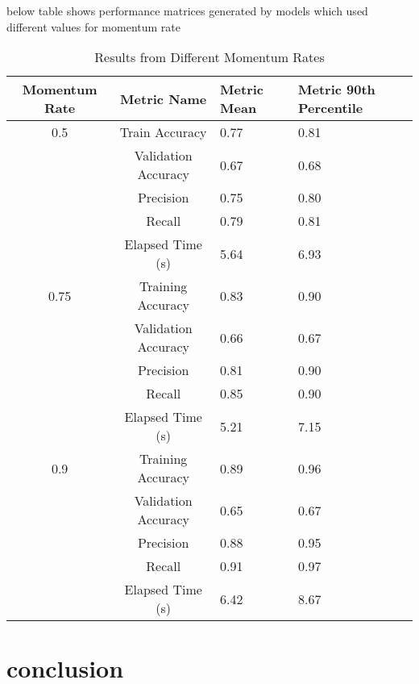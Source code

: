 \documentclass{article}
\begin{document}
below table shows performance matrices generated by models which used different values for momentum rate 
\begin{table}[h]
\begin{center}
\begin{tabular}{ |c|c|p{1.5cm}|p{2cm}|} 
\hline
Momentum Rate & Metric Name & Metric Mean & Metric 90th Percentile\\
\hline
0.5 & Train Accuracy & 0.77 & 0.81\\ 
& Validation Accuracy & 0.67 & 0.68\\ 
& Precision & 0.75 & 0.80 \\ 
& Recall & 0.79 & 0.81 \\ 
& Elapsed Time (s) & 5.64 & 6.93 \\
\hline
0.75 & Training Accuracy & 0.83 & 0.90\\ 
& Validation Accuracy & 0.66 & 0.67 \\ 
& Precision & 0.81 & 0.90 \\ 
& Recall & 0.85 & 0.90 \\ 
& Elapsed Time (s) & 5.21 & 7.15 \\
\hline
0.9 & Training Accuracy & 0.89 & 0.96\\ 
& Validation Accuracy & 0.65 & 0.67 \\ 
& Precision & 0.88 & 0.95 \\ 
& Recall & 0.91 & 0.97 \\ 
& Elapsed Time (s) & 6.42 & 8.67 \\
\hline
\end{tabular}
\caption{Results from Different Momentum Rates}
\label{tab:results_momentum}
\end{center}
\end{table}
\section{conclusion}




\end{document}
